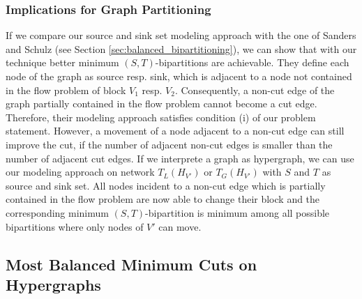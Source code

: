 \subsubsection*{Implications for Graph Partitioning}
If we compare our source and sink set modeling approach with the one of Sanders and Schulz
\cite{sanders2011engineering} (see Section \ref{sec:balanced_bipartitioning}), we can show that
with our technique better minimum $(S,T)$-bipartitions are achievable. They define each node of the graph
as source resp. sink, which is adjacent to a node not contained in the flow problem of block $V_1$
resp. $V_2$. Consequently, a non-cut edge of the graph partially contained in the flow problem
cannot become a cut edge. Therefore, their modeling approach satisfies condition (i) of our problem
statement. However, a movement of a node adjacent to a non-cut edge can still improve the cut, if
the number of adjacent non-cut edges is smaller than the number of adjacent cut edges. 
If we interprete a graph as hypergraph, we can use our modeling 
approach on network $T_L(H_{V'})$ or $T_G(H_{V'})$ with $S$ and $T$ as source and sink set. 
All nodes incident to a non-cut edge which is partially contained in the flow problem
are now able to change their block and the corresponding minimum $(S,T)$-bipartition is minimum
among all possible bipartitions where only nodes of $V'$ can move. \\


\subsection{Most Balanced Minimum Cuts on Hypergraphs}
\label{sec:mbmc_hypergraphs}

